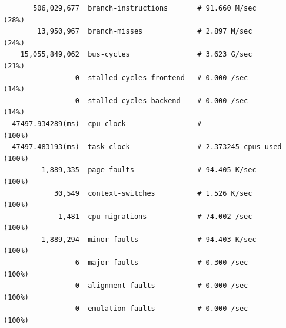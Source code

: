 \begin{verbatim}
       506,029,677  branch-instructions       # 91.660 M/sec        (28%)
        13,950,967  branch-misses             # 2.897 M/sec         (24%)
    15,055,849,062  bus-cycles                # 3.623 G/sec         (21%)
                 0  stalled-cycles-frontend   # 0.000 /sec          (14%)
                 0  stalled-cycles-backend    # 0.000 /sec          (14%)
  47497.934289(ms)  cpu-clock                 #                     (100%)
  47497.483193(ms)  task-clock                # 2.373245 cpus used  (100%)
         1,889,335  page-faults               # 94.405 K/sec        (100%)
            30,549  context-switches          # 1.526 K/sec         (100%)
             1,481  cpu-migrations            # 74.002 /sec         (100%)
         1,889,294  minor-faults              # 94.403 K/sec        (100%)
                 6  major-faults              # 0.300 /sec          (100%)
                 0  alignment-faults          # 0.000 /sec          (100%)
                 0  emulation-faults          # 0.000 /sec          (100%)
\end{verbatim}
\fi

